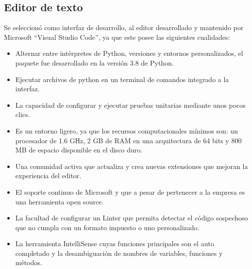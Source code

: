 \subsection{Editor de texto}
Se seleccionó como interfaz de desarrollo, al editor desarrollado y mantenido por Microsoft ``Visual Studio Code'', ya que este posee las siguientes cualidades:
\begin{itemize}
    \item Alternar entre intérpretes de Python, versiones y entornos personalizados, el paquete fue desarrollado en la versión 3.8 de Python.
    \item Ejecutar archivos de python en un terminal de comandos integrado a la interfaz.
    \item La capacidad de configurar y ejecutar pruebas unitarias mediante unos pocos clics.
    \item Es un entorno ligero, ya que los recursos computacionales mínimos son: un procesador de 1.6 GHz, 2 GB de RAM en una arquitectura de 64 bits y 800 MB de espacio disponible en el disco duro.
    \item Una comunidad activa que actualiza y crea nuevas extensiones que mejoran la experiencia del editor.
    \item El soporte continuo de Microsoft y que a pesar de pertenecer a la empresa es una herramienta open source.
    \item La facultad de configurar un Linter que permita detectar el código sospechoso que no cumpla con un formato impuesto o uno personalizado. 
    \item La herramienta IntelliSense cuyas funciones principales son el auto completado y la desambiguación de nombres de variables, funciones y métodos.
\end{itemize}

